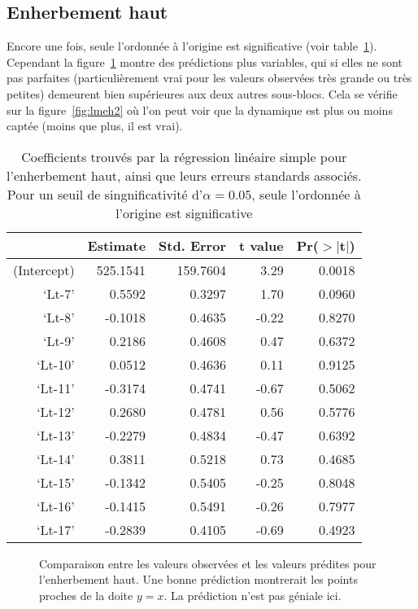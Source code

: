\documentclass[a4paper, 11pt]{article}
\begin{document}
\subsection{Enherbement haut}

Encore une fois, seule l'ordonnée à l'origine est significative (voir table~\ref{tab:lmeh}). Cependant la figure~\ref{fig:lmeh1} montre des prédictions plus variables, qui si elles ne sont pas parfaites (particulièrement vrai pour les valeurs observées très grande ou très petites) demeurent bien supérieures aux deux autres sous-blocs. Cela se vérifie sur la figure~\ref{fig:lmeh2} où l'on peut voir que la dynamique est plus ou moins captée (moins que plus, il est vrai).

\begin{table}[ht]
\centering
\caption{Coefficients trouvés par la régression linéaire simple pour l'enherbement haut, ainsi que leurs erreurs standards associés. Pour un seuil de singnificativité d'$\alpha = 0.05$, seule l'ordonnée à l'origine est significative}
\label{tab:lmeh}
\begin{tabular}{rrrrr}
 & Estimate & Std. Error & t value & Pr($>$$|$t$|$) \\ 
  \hline
(Intercept) & 525.1541 & 159.7604 & 3.29 & 0.0018 \\ 
  `Lt-7' & 0.5592 & 0.3297 & 1.70 & 0.0960 \\ 
  `Lt-8' & -0.1018 & 0.4635 & -0.22 & 0.8270 \\ 
  `Lt-9' & 0.2186 & 0.4608 & 0.47 & 0.6372 \\ 
  `Lt-10' & 0.0512 & 0.4636 & 0.11 & 0.9125 \\ 
  `Lt-11' & -0.3174 & 0.4741 & -0.67 & 0.5062 \\ 
  `Lt-12' & 0.2680 & 0.4781 & 0.56 & 0.5776 \\ 
  `Lt-13' & -0.2279 & 0.4834 & -0.47 & 0.6392 \\ 
  `Lt-14' & 0.3811 & 0.5218 & 0.73 & 0.4685 \\ 
  `Lt-15' & -0.1342 & 0.5405 & -0.25 & 0.8048 \\ 
  `Lt-16' & -0.1415 & 0.5491 & -0.26 & 0.7977 \\ 
  `Lt-17' & -0.2839 & 0.4105 & -0.69 & 0.4923 \\ 
\end{tabular}
\end{table}

\begin{figure}[ht]
 \centering
 \caption{Comparaison entre les valeurs observées et les valeurs prédites pour l'enherbement haut. Une bonne prédiction montrerait les points proches de la doite $y=x$. La prédiction n'est pas géniale ici.}
 \label{fig:lmeh1}
\end{figure}
\end{document}
